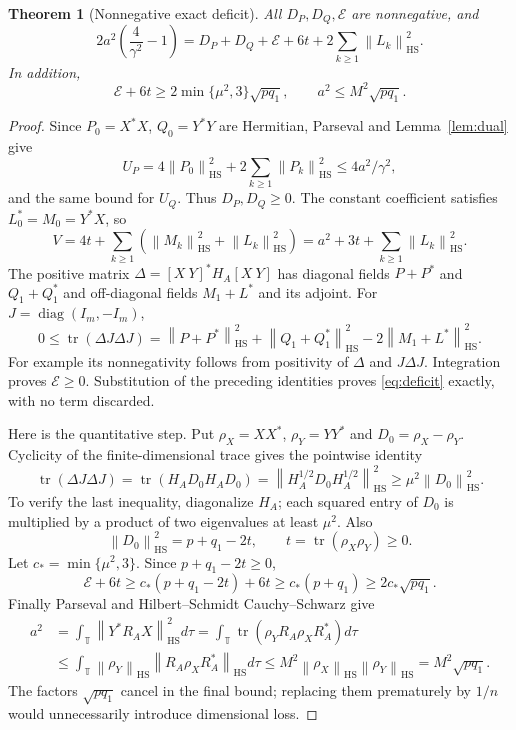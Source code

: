\documentclass[11pt]{article}
\newtheorem{theorem}{Theorem}[section]
\theoremstyle{remark}\newtheorem{remark}[theorem]{Remark}
\newcommand{\HS}{\mathrm{HS}}
\newcommand{\tr}{\operatorname{tr}}
\newcommand{\T}{\mathbb T}
\newcommand{\norm}[1]{\left\lVert #1\right\rVert}
\begin{document}
\begin{theorem}[Nonnegative exact deficit]\label{thm:deficit}
All $D_P,D_Q,\mathcal E$ are nonnegative, and
\begin{equation}\label{eq:deficit}
2a^2\left(\frac4{\gamma^2}-1\right)=
D_P+D_Q+\mathcal E+6t+2\sum_{k\ge1}\norm{L_k}_\HS^2.
\end{equation}
In addition,
\begin{equation}\label{eq:slack}
\mathcal E+6t\ge2\min\{\mu^2,3\}\sqrt{p q_1},\qquad
a^2\le M^2\sqrt{p q_1}.
\end{equation}
\end{theorem}
\begin{proof}
Since $P_0=X^*X$, $Q_0=Y^*Y$ are Hermitian, Parseval and Lemma~\ref{lem:dual} give
\[U_P=4\norm{P_0}_\HS^2+2\sum_{k\ge1}\norm{P_k}_\HS^2\le4a^2/\gamma^2,
\]
and the same bound for $U_Q$. Thus $D_P,D_Q\ge0$. The constant coefficient satisfies $L_0^*=M_0=Y^*X$, so
\[V=4t+\sum_{k\ge1}(\norm{M_k}_\HS^2+\norm{L_k}_\HS^2)
=a^2+3t+\sum_{k\ge1}\norm{L_k}_\HS^2.
\]
The positive matrix $\Delta=[X\ Y]^*H_A[X\ Y]$ has diagonal fields $P+P^*$ and $Q_1+Q_1^*$ and off-diagonal fields $M_1+L^*$ and its adjoint. For $J=\operatorname{diag}(I_m,-I_m)$,
\[0\le\tr(\Delta J\Delta J)=
\norm{P+P^*}_\HS^2+\norm{Q_1+Q_1^*}_\HS^2-2\norm{M_1+L^*}_\HS^2.
\]
For example its nonnegativity follows from positivity of $\Delta$ and $J\Delta J$. Integration proves $\mathcal E\ge0$. Substitution of the preceding identities proves \eqref{eq:deficit} exactly, with no term discarded.

Here is the quantitative step. Put $\rho_X=XX^*$, $\rho_Y=YY^*$ and $D_0=\rho_X-\rho_Y$. Cyclicity of the finite-dimensional trace gives the pointwise identity
\[\tr(\Delta J\Delta J)=\tr(H_AD_0H_AD_0)
=\norm{H_A^{1/2}D_0H_A^{1/2}}_\HS^2\ge\mu^2\norm{D_0}_\HS^2.
\]
To verify the last inequality, diagonalize $H_A$; each squared entry of $D_0$ is multiplied by a product of two eigenvalues at least $\mu^2$. Also
\[\norm{D_0}_\HS^2=p+q_1-2t,\qquad
t=\tr(\rho_X\rho_Y)\ge0.
\]
Let $c_*=\min\{\mu^2,3\}$. Since $p+q_1-2t\ge0$,
\[\mathcal E+6t\ge c_*(p+q_1-2t)+6t
\ge c_*(p+q_1)\ge2c_*\sqrt{p q_1}.
\]
Finally Parseval and Hilbert--Schmidt Cauchy--Schwarz give
\begin{align*}
a^2&=\int_\T\norm{Y^*R_AX}_\HS^2d\tau
=\int_\T\tr(\rho_YR_A\rho_XR_A^*)d\tau\\
&\le\int_\T\norm{\rho_Y}_\HS\norm{R_A\rho_XR_A^*}_\HS d\tau
\le M^2\norm{\rho_X}_\HS\norm{\rho_Y}_\HS=M^2\sqrt{p q_1}.
\end{align*}
The factors $\sqrt{p q_1}$ cancel in the final bound; replacing them prematurely by $1/n$ would unnecessarily introduce dimensional loss.
\end{proof}
\end{document}

